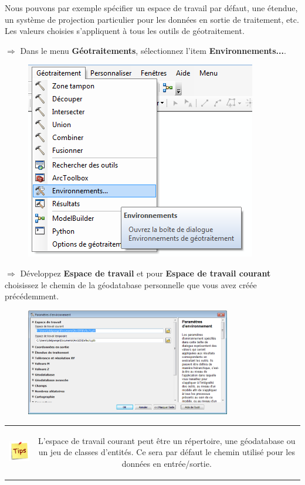 \documentclass[11pt]{article}
\newcommand{\action}{$\Rightarrow$ }
\newenvironment{note}{%
	\begin{tabular}[t t]{c c}
		\includegraphics{img/tips.png}
		 &
		\begin{minipage}[c]{0.9\linewidth}
			\begin{sffamily}
}{%
			\end{sffamily}
		\end{minipage}
	\end{tabular}	
}
\begin{document}
Nous pouvons par exemple spécifier un espace de travail par défaut, une étendue, un système de projection particulier pour les données en sortie de traitement, etc. Les valeurs choisies s'appliquent à tous les outils de géotraitement.

\action Dans le menu \textbf{Géotraitements}, sélectionnez l'item \textbf{Environnements...}.
\begin{figure}[H]
	\center \includegraphics{img/td3/environnements_menu.png}\\
\end{figure}

\action Développez \textbf{Espace de travail} et pour \textbf{Espace de travail courant} choisissez le chemin de la géodatabase personnelle que vous avez créée précédemment.
\begin{figure}[H]
	\center \includegraphics[width=0.8\textwidth]{img/td3/environnements_espace_travail.png}\\
\end{figure}

\begin{note}
L'espace de travail courant peut être un répertoire, une géodatabase ou un jeu de classes d'entités. Ce sera par défaut le chemin utilisé pour les données en entrée/sortie.
\end{note}
\end{document}
